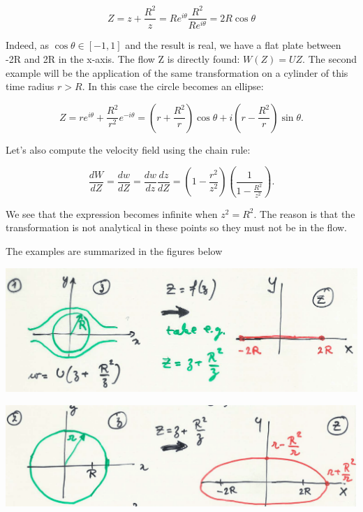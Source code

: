 		\begin{equation}
		Z = z + \frac{R^2}{z} = Re^{i\theta}  \frac{R^2}{Re^{i\theta}} = 2 R \cos \theta 
		\end{equation}
		
		Indeed, as $\cos \theta \in [-1,1]$ and the result is real, we have a flat plate between -2R and 2R in the x-axis. The flow Z is directly found: $W(Z) = UZ$. The second example will be the application of the same transformation on a cylinder of this time radius $r>R$. In this case the circle becomes an ellipse:
		
		\begin{equation}
		Z = r e^{i\theta} + \frac{R^2}{r^2}e^{-i\theta} = \left( r + \frac{R^2}{r} \right)\cos \theta + i \left( r - \frac{R^2}{r} \right) \sin \theta.
		\end{equation}		 
		
		Let's also compute the velocity field using the chain rule:
		
		\begin{equation}
		\frac{dW}{dZ} = \frac{dw}{dZ} = \frac{dw}{dz}\frac{dz}{dZ} = \left( 1 -\frac{r^2}{z^2} \right) \left( \frac{1}{1-\frac{R^2}{z^2}} \right).
		\end{equation}
		
		We see that the expression becomes infinite when $z^2 = R^2$. The reason is that the transformation is not analytical in these points so they must not be in the flow. 
		
		The examples are summarized in the figures below 
		
		\begin{center}
		\begin{minipage}{0.45\textwidth}
		\includegraphics[scale=0.15]{ch2/29}
		\end{minipage}
		\begin{minipage}{0.45\textwidth}
		\includegraphics[scale=0.2]{ch2/30}
		\end{minipage}
		\end{center}
		
